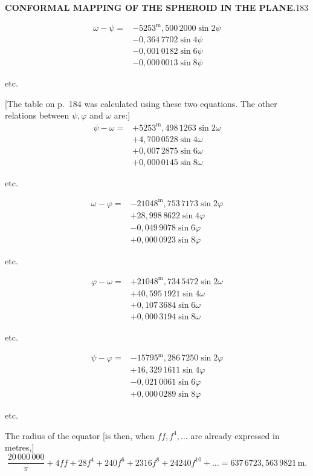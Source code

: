 \par\clearpage
\noindent\null\hfill{\small\textbf{CONFORMAL MAPPING OF THE SPHEROID IN THE PLANE.}}\hfill183\par\medskip
\[
\begin{aligned}
\omega-\psi={}&-5253^{\mathrm{m}}{,}500\,2000\sin2\psi\\
&-0{,}364\,7702\sin4\psi\\
&-0{,}001\,0182\sin6\psi\\
&-0{,}000\,0013\sin8\psi
\end{aligned}
\]
{\centering etc.\par}
[The table on p.~184 was calculated using these two equations. The other relations between \(\psi,\varphi\) and \(\omega\) are:]
\[
\begin{aligned}
\psi-\omega={}&+5253^{\mathrm{m}}{,}498\,1263\sin2\omega\\
&+4{,}700\,0528\sin4\omega\\
&+0{,}007\,2875\sin6\omega\\
&+0{,}000\,0145\sin8\omega
\end{aligned}
\]
{\centering etc.\par}
\[
\begin{aligned}
\omega-\varphi={}&-21048^{\mathrm{m}}{,}753\,7173\sin2\varphi\\
&+28{,}998\,8622\sin4\varphi\\
&-0{,}049\,9078\sin6\varphi\\
&+0{,}000\,0923\sin8\varphi
\end{aligned}
\]
{\centering etc.\par}
\[
\begin{aligned}
\varphi-\omega={}&+21048^{\mathrm{m}}{,}734\,5472\sin2\omega\\
&+40{,}595\,1921\sin4\omega\\
&+0{,}107\,3684\sin6\omega\\
&+0{,}000\,3194\sin8\omega
\end{aligned}
\]
{\centering etc.\par}
\[
\begin{aligned}
\psi-\varphi={}&-15795^{\mathrm{m}}{,}286\,7250\sin2\varphi\\
&+16{,}329\,1611\sin4\varphi\\
&-0{,}021\,0061\sin6\varphi\\
&+0{,}000\,0289\sin8\varphi
\end{aligned}
\]
{\centering etc.\par}
The radius of the equator [is then, when \(ff,f^4,\ldots\) are already expressed in metres,]
\[
\frac{20\,000\,000}{\pi}+4ff+28f^4+240f^6+2316f^8+24240f^{10}+\ldots
=637\,6723{,}563\,9821\,\mathrm{m}.
\]

